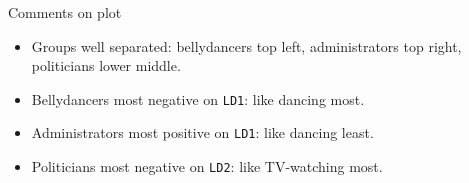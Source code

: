 \documentclass[unknownkeysallowed]{beamer}\usepackage[]{graphicx}\usepackage[]{color}
\makeatletter
\def\maxwidth{ %
  \ifdim\Gin@nat@width>\linewidth
    \linewidth
  \else
    \Gin@nat@width
  \fi
}
\newcommand{\hlopt}[1]{\textcolor[rgb]{0,0,0}{#1}}%
\newcommand{\hlstd}[1]{\textcolor[rgb]{0.345,0.345,0.345}{#1}}%
\newcommand{\hlkwc}[1]{\textcolor[rgb]{0.333,0.667,0.333}{#1}}%
\newcommand{\hlkwd}[1]{\textcolor[rgb]{0.737,0.353,0.396}{\textbf{#1}}}%
\newenvironment{kframe}{%
 \def\at@end@of@kframe{}%
 \ifinner\ifhmode%
  \def\at@end@of@kframe{\end{minipage}}%
  \begin{minipage}{\columnwidth}%
 \fi\fi%
 \def\FrameCommand##1{\hskip\@totalleftmargin \hskip-\fboxsep
 \colorbox{shadecolor}{##1}\hskip-\fboxsep
     \hskip-\linewidth \hskip-\@totalleftmargin \hskip\columnwidth}%
 \MakeFramed {\advance\hsize-\width
   \@totalleftmargin\z@ \linewidth\hsize
   \@setminipage}}%
 {\par\unskip\endMakeFramed%
 \at@end@of@kframe}
\newenvironment{knitrout}{}{} %
\makeatother
\begin{document}

\begin{frame}[fragile]{Comments on plot}
  
  \begin{itemize}
  \item Groups well separated: bellydancers top left, administrators
    top right, politicians lower middle.
  \item Bellydancers most negative on \texttt{LD1}: like dancing most.
  \item Administrators most positive on \texttt{LD1}: like dancing least.
  \item Politicians most negative on \texttt{LD2}: like TV-watching most.
  \end{itemize}
  
\end{frame}
\end{document}
